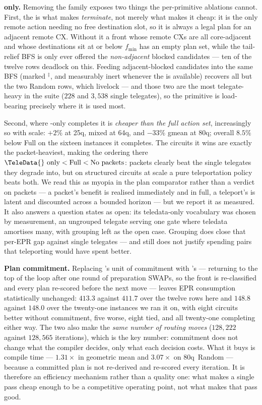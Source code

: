 \textbf{\TeleData{} only.} Removing the \TeleGate{} family exposes two
things the per-primitive ablations cannot. First, the \TeleGate{} is
what makes \PORTER{} \emph{terminate}, not merely what makes it cheap:
it is the only remote action needing no free destination slot, so it is
always a legal plan for an adjacent remote CX. Without it a front whose
remote CXs are all core-adjacent and whose destinations sit at or below
$f_\mathrm{min}$ has an empty plan set, while the tail-relief BFS is
only ever offered the \emph{non-adjacent} blocked candidates --- ten of
the twelve rows deadlock on this. Feeding adjacent-blocked candidates
into the same BFS (marked $^{\ddagger}$, and measurably inert whenever
the \TeleGate{} is available) recovers all but the two Random rows,
which livelock --- and those two are the most telegate-heavy in the
suite ($228$ and $3{,}538$ single telegates), so the primitive is
load-bearing precisely where it is used most.

Second, where \TeleData{}-only completes it is \emph{cheaper than the
full action set}, increasingly so with scale: $+2\%$ at 25q, mixed at
64q, and $-33\%$ gmean at 80q; overall $8.5\%$ below Full on the
sixteen instances it completes. The circuits
it wins are exactly the packet-heaviest, making the ordering there
$\text{\TeleData{} only} < \text{Full} < \text{No packets}$: packets
clearly beat the single telegates they degrade into, but on structured
circuits at scale a pure teleportation policy beats both. We read this
as myopia in the plan comparator rather than a verdict on packets --- a
packet's benefit is realised immediately and in full, a teleport's is
latent and discounted across a bounded horizon --- but we report it as
measured. It also answers a question \dSABRE{} states as open: its
teledata-only vocabulary was chosen by measurement, an ungrouped
telegate serving one gate where teledata amortises many, with grouping
left as the open case. Grouping does close that per-EPR gap against
single telegates --- and still does not justify spending pairs that
teleporting would have spent better.

\textbf{Plan commitment.} Replacing \PORTER{}'s unit of commitment with
\dSABRE{}'s --- returning to the top of the loop after one round of
preparation SWAPs, so the front is re-classified and every plan
re-scored before the next move --- leaves EPR consumption
statistically unchanged: $413.3$ against $411.7$ over the twelve rows
here and $148.8$ against $148.0$ over the twenty-one instances we ran
it on, with eight circuits better without commitment, five worse,
eight tied, and all twenty-one completing either way. The two also make
the \emph{same number of routing moves} ($128{,}222$ against
$128{,}565$ iterations), which is the key number: commitment does not
change what the compiler decides, only what each decision costs. What
it buys is compile time --- $1.31\times$ in geometric mean and
$3.07\times$ on 80q~Random --- because a committed plan is not
re-derived and re-scored every iteration. It is therefore an efficiency
mechanism rather than a quality one: what makes a single \PORTER{} pass
cheap enough to be a competitive operating point, not what makes that
pass good.

